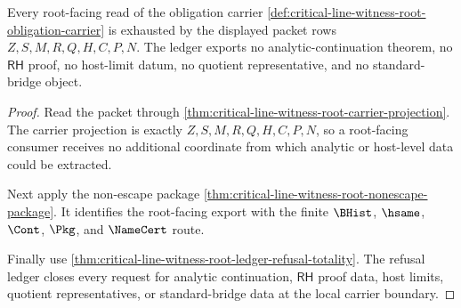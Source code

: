 \begin{theorem}
\label{thm:critical-line-witness-root-ledger-nonescape}
Every root-facing read of the obligation carrier
\autoref{def:critical-line-witness-root-obligation-carrier} is exhausted by
the displayed packet rows $Z,S,M,R,Q,H,C,P,N$. The ledger exports no
analytic-continuation theorem, no $\mathsf{RH}$ proof, no host-limit datum, no
quotient representative, and no standard-bridge object.
\end{theorem}
\begin{proof}
Read the packet through
\autoref{thm:critical-line-witness-root-carrier-projection}. The carrier
projection is exactly $Z,S,M,R,Q,H,C,P,N$, so a root-facing consumer receives
no additional coordinate from which analytic or host-level data could be
extracted.

Next apply the non-escape package
\autoref{thm:critical-line-witness-root-nonescape-package}. It identifies
the root-facing export with the finite $\BHist$, $\hsame$, $\Cont$, $\Pkg$,
and $\NameCert$ route.

Finally use
\autoref{thm:critical-line-witness-root-ledger-refusal-totality}. The refusal
ledger closes every request for analytic continuation, $\mathsf{RH}$ proof
data, host limits, quotient representatives, or standard-bridge data at the
local carrier boundary.
\end{proof}
